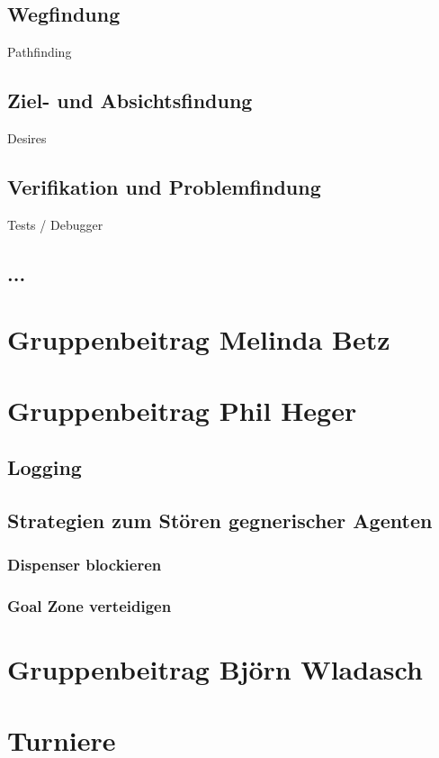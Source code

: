 \documentclass[runningheads]{llncs}
\begin{document}
\subsection{Wegfindung}
Pathfinding

\subsection{Ziel- und Absichtsfindung}
Desires

\subsection{Verifikation und Problemfindung}
Tests / Debugger

\subsection{...}

\section{Gruppenbeitrag Melinda Betz}

\section{Gruppenbeitrag Phil Heger}
\subsection{Logging}
\subsection{Strategien zum Stören gegnerischer Agenten}
\subsubsection{Dispenser blockieren}
\subsubsection{Goal Zone verteidigen}

\section{Gruppenbeitrag Björn Wladasch}

\section{Turniere}
\end{document}
